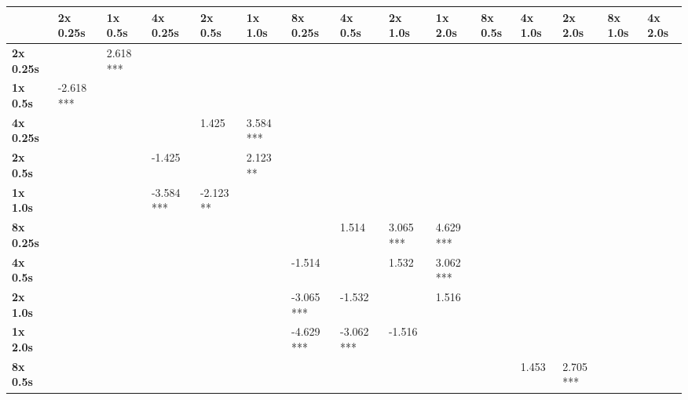 \begin{tabular}{lllllllllllllll}
\toprule
{} &    2x 0.25s &    1x 0.5s &    4x 0.25s &    2x 0.5s &    1x 1.0s &    8x 0.25s &     4x 0.5s &    2x 1.0s &    1x 2.0s &     8x 0.5s &  4x 1.0s &    2x 2.0s &  8x 1.0s & 4x 2.0s \\
\midrule
\textbf{2x 0.25s} &             &  2.618 *** &             &            &            &             &             &            &            &             &          &            &          &         \\
\textbf{1x 0.5s } &  -2.618 *** &            &             &            &            &             &             &            &            &             &          &            &          &         \\
\textbf{4x 0.25s} &             &            &             &     1.425  &  3.584 *** &             &             &            &            &             &          &            &          &         \\
\textbf{2x 0.5s } &             &            &     -1.425  &            &   2.123 ** &             &             &            &            &             &          &            &          &         \\
\textbf{1x 1.0s } &             &            &  -3.584 *** &  -2.123 ** &            &             &             &            &            &             &          &            &          &         \\
\textbf{8x 0.25s} &             &            &             &            &            &             &      1.514  &  3.065 *** &  4.629 *** &             &          &            &          &         \\
\textbf{4x 0.5s } &             &            &             &            &            &     -1.514  &             &     1.532  &  3.062 *** &             &          &            &          &         \\
\textbf{2x 1.0s } &             &            &             &            &            &  -3.065 *** &     -1.532  &            &     1.516  &             &          &            &          &         \\
\textbf{1x 2.0s } &             &            &             &            &            &  -4.629 *** &  -3.062 *** &    -1.516  &            &             &          &            &          &         \\
\textbf{8x 0.5s } &             &            &             &            &            &             &             &            &            &             &   1.453  &  2.705 *** &          &         \\

\end{tabular}
